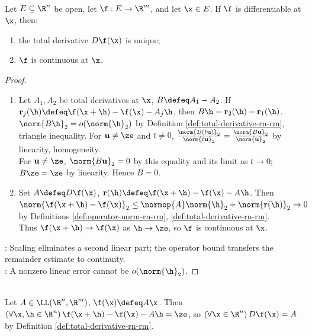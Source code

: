\begin{theorem} \label{thm:total-derivative-unique-and-continuous} \\
Let $E\subseteq\R^n$ be open, let $\f:E\to\R^m$, and let $\x\in E$. If $\f$ is differentiable at $\x$, then:
\begin{enumerate}[label=(\roman*)]
\setlength{\itemsep}{0pt}
\item the total derivative $D\f(\x)$ is unique;
\item $\f$ is continuous at $\x$.
\end{enumerate}
\begin{proof}
\begin{enumerate}[label=(\roman*)]
\setlength{\itemsep}{0pt}
\item Let $A_1,A_2$ be total derivatives at $\x$, $B\defeq A_1-A_2$. If $\mathbf r_j(\h)\defeq\f(\x+\h)-\f(\x)-A_j\h$, then $B\h=\mathbf r_2(\h)-\mathbf r_1(\h)$.\\
$\norm{B\h}_2=o(\norm{\h}_2)$ by Definition \ref{def:total-derivative-rn-rm},  triangle inequality. For $\mathbf u\neq\ze$ and $t\neq0$, $\frac{\norm{B(t\mathbf u)}_2}{\norm{t\mathbf u}_2}=\frac{\norm{B\mathbf u}_2}{\norm{\mathbf u}_2}$ by linearity,  homogeneity.\\
For $\mathbf u\neq\ze$, $\norm{B\mathbf u}_2=0$ by this equality and its limit as $t\to0$; $B\ze=\ze$ by linearity. Hence $B=0$.
\item Set $A\defeq D\f(\x)$, $\mathbf r(\h)\defeq\f(\x+\h)-\f(\x)-A\h$. Then $\norm{\f(\x+\h)-\f(\x)}_2\leq\normop{A}\norm{\h}_2+\norm{\mathbf r(\h)}_2\to0$ by Definitions \ref{def:operator-norm-rn-rm}, \ref{def:total-derivative-rn-rm}.\\
Thus $\f(\x+\h)\to\f(\x)$ as $\h\to\ze$, so $\f$ is continuous at $\x$.
\end{enumerate}
: Scaling eliminates a second linear part; the operator bound transfers the remainder estimate to continuity.\\
: A nonzero linear error cannot be $o(\norm{\h}_2)$.
\end{proof}
\end{theorem}

\begin{example} \label{ex:derivative-of-linear-map} \\
Let $A\in\LL(\R^n,\R^m)$, $\f(\x)\defeq A\x$. Then $(\forall\x,\h\in\R^n)\,\f(\x+\h)-\f(\x)-A\h=\ze$, so $(\forall\x\in\R^n)\,D\f(\x)=A$ by Definition \ref{def:total-derivative-rn-rm}.
\end{example}

